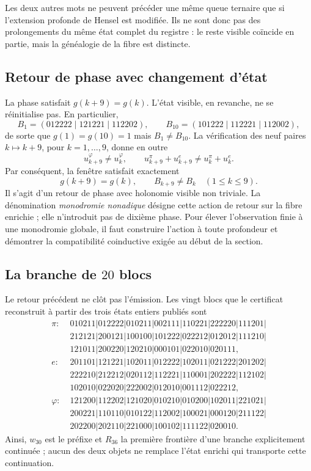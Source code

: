 Les deux autres mots ne peuvent précéder une même queue ternaire que si
l'extension profonde de Hensel est modifiée. Ils ne sont donc pas des prolongements du
même état complet du registre : le reste visible coïncide en partie, mais
la généalogie de la fibre est distincte.

\subsection{Retour de phase avec changement d'état}

La phase satisfait \(g(k+9)=g(k)\). L'état visible, en revanche, ne se
réinitialise pas. En particulier,
\[
B_1=(012222\mid121221\mid112202),
\qquad
B_{10}=(101222\mid112221\mid112002),
\]
de sorte que \(g(1)=g(10)=1\) mais \(B_1\ne B_{10}\). La vérification des
neuf paires \(k\mapsto k+9\), pour \(k=1,\ldots,9\), donne en outre
\[
u_{k+9}^\varphi\ne u_k^\varphi,
\qquad
u_{k+9}^\pi+u_{k+9}^e\ne u_k^\pi+u_k^e.
\]
Par conséquent, la fenêtre satisfait exactement
\[
\boxed{g(k+9)=g(k),\qquad B_{k+9}\ne B_k
\quad(1\le k\le9).}
\]
Il s'agit d'un retour de phase avec holonomie visible non triviale. La dénomination
\emph{monodromie nonadique} désigne cette action de retour sur la
fibre enrichie ; elle n'introduit pas de dixième phase. Pour élever l'observation
finie à une monodromie globale, il faut construire l'action à toute profondeur
et démontrer la compatibilité coinductive exigée au début de la section.

\subsection{La branche de \(20\) blocs}

Le retour précédent ne clôt pas l'émission. Les vingt blocs que le
certificat reconstruit à partir des trois états entiers publiés sont
\begin{align*}
\pi:\;&010211|012222|010211|002111|110221|222220|111201|\\
&212121|200121|100100|101222|022212|012012|111210|\\
&121011|200220|120210|000101|022010|020111,\\[2pt]
e:\;&201101|121221|102011|012222|102011|021222|201202|\\
&222210|212212|020112|112221|110001|202222|112102|\\
&102010|022020|222002|012010|001112|022212,\\[2pt]
\varphi:\;&121200|112202|121020|010210|010200|102011|221021|\\
&200221|110110|010122|112002|100021|000120|211122|\\
&202200|202110|221000|100102|111122|020010.
\end{align*}
Ainsi, \(w_{30}\) est le préfixe et \(R_{36}\) la première frontière d'une branche
explicitement continuée ; aucun des deux objets ne remplace l'état
enrichi qui transporte cette continuation.

